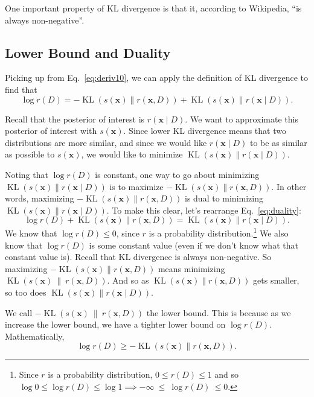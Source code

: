\documentclass[12pt]{article}
\newcommand{\KL}{\operatorname{KL}}
\begin{document}
One important property of KL divergence is that it, according to Wikipedia,
\enquote{is always non-negative}.

\subsection{Lower Bound and Duality}

Picking up from Eq.~\ref{eq:deriv10}, we can apply the definition of KL
divergence to find that
\begin{equation}\label{eq:duality}
    \log{r(D)} = -\KL(s(\bm{x}) \parallel r(\bm{x}, D)) + \KL(s(\bm{x})
    \parallel r(\bm{x} \mid D)).
\end{equation}

Recall that the posterior of interest is $r(\bm{x} \mid D)$.  We want to
approximate this posterior of interest with $s(\bm{x})$.  Since lower KL
divergence means that two distributions are more similar, and since we would
like $r(\bm{x} \mid D)$ to be as similar as possible to $s(\bm{x})$, we would
like to minimize $\KL(s(\bm{x}) \parallel r(\bm{x} \mid D))$.

Noting that $\log{r(D)}$ is constant, one way to go about minimizing
$\KL(s(\bm{x}) \parallel r(\bm{x} \mid D))$ is to maximize $-\KL(s(\bm{x})
\parallel r(\bm{x}, D))$.  In other words, maximizing $-\KL(s(\bm{x}) \parallel
r(\bm{x}, D))$ is dual to minimizing $\KL(s(\bm{x}) \parallel r(\bm{x} \mid
D))$.  To make this clear, let's rearrange Eq.~\ref{eq:duality}:
\begin{equation}
    \log{r(D)} + \KL(s(\bm{x}) \parallel r(\bm{x}, D)) = \KL(s(\bm{x})
    \parallel r(\bm{x} \mid D)).
\end{equation}
We know that $\log{r(D)} \leq 0$, since $r$ is a probability
distribution.\footnote{Since $r$ is a probability distribution, $0 \leq r(D)
\leq 1$ and so $\log{0} \leq \log{r(D)} \leq \log{1} \implies
-\infty~\leq~\log{r(D)}~\leq 0$.}  We also know that $\log{r(D)}$ is some
constant value (even if we don't know what that constant value is).  Recall that
KL divergence is always non-negative.  So maximizing $-\KL(s(\bm{x}) \parallel
r(\bm{x},D))$ means minimizing $\KL(s(\bm{x})~\parallel~r(\bm{x},D))$.  And so
as $\KL(s(\bm{x}) \parallel r(\bm{x}, D))$ gets smaller, so too does
$\KL(s(\bm{x}) \parallel r(\bm{x} \mid D))$.

We call $-\KL(s(\bm{x})~\parallel~r(\bm{x},D))$ the lower bound.  This is
because as we increase the lower bound, we have a tighter lower bound on
$\log{r(D)}$.  Mathematically,
\begin{equation}
    \log{r(D)} \geq -\KL(s(\bm{x}) \parallel r(\bm{x}, D)).
\end{equation}
\end{document}
